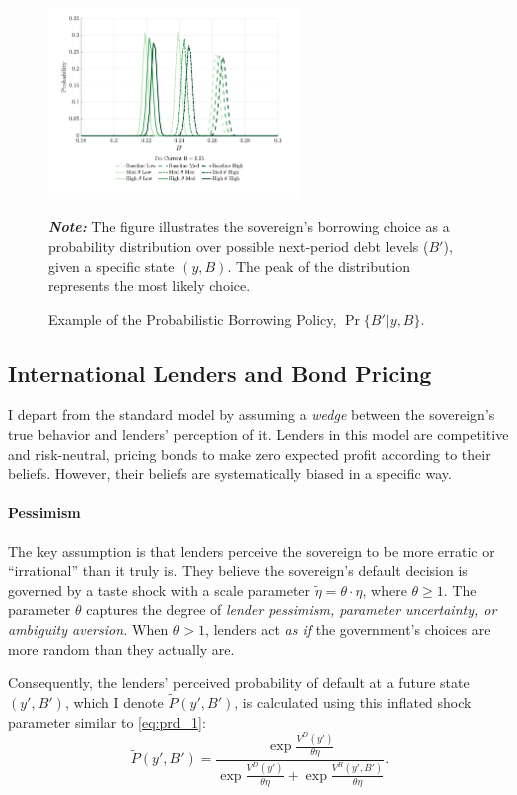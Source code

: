 \documentclass[12pt]{article}
\theoremstyle{plain}
\begin{document}
\begin{figure}[h!]
	\centering
	\includegraphics[width=0.6\textwidth]{../../pessimism-default-model/results/comparison_figure_8.pdf}
	\caption{Example of the Probabilistic Borrowing Policy, $\Pr\{B'|y,B\}$.}
	\label{fig:borrowing_dist_example}
	\parbox{\textwidth}{\small\textit{\textbf{Note:} }The figure illustrates the sovereign's borrowing choice as a probability distribution over possible next-period debt levels ($B'$), given a specific state $(y, B)$. The peak of the distribution represents the most likely choice.}
\end{figure}

\subsection{International Lenders and Bond Pricing}

I depart from the standard model by assuming a \textit{wedge} between the
sovereign's true behavior and lenders' perception of it. Lenders in this model
are competitive and risk-neutral, pricing bonds to make zero expected profit
according to their beliefs. However, their beliefs are systematically biased in
a specific way.

\paragraph{Pessimism}The key assumption is that lenders perceive the sovereign to be more erratic or
``irrational'' than it truly is. They believe the sovereign's default decision
is governed by a taste shock with a scale parameter $\tilde{\eta} = \theta
	\cdot \eta$, where $\theta \ge 1$. The parameter $\theta$ captures the degree
of \textit{lender pessimism, parameter uncertainty, or ambiguity aversion.
}When $\theta > 1$, lenders act \textit{as if} the government's choices are
more random than they actually are.

Consequently, the lenders' perceived probability of default at a future state
$(y', B')$, which I denote $\tilde{P}(y', B')$, is calculated using this
inflated shock parameter similar to \eqref{eq:prd_1}:
\begin{equation}
	\tilde{P}(y', B') = \frac{\exp\frac{V^D(y')}{\theta\eta}}{\exp\frac{V^D(y')}{\theta\eta}+\exp\frac{V^R(y',B')}{\theta\eta}}.
	\label{eq:plender}
\end{equation}
\end{document}
